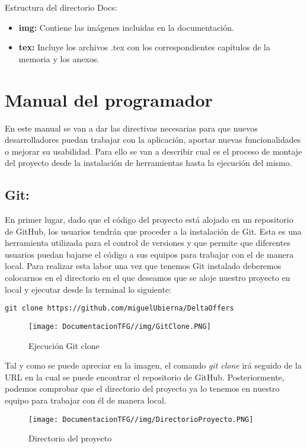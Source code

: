 Estructura del directorio Docs:
\begin{itemize}
    \item \textbf{img: } Contiene las imágenes incluidas en la documentación.
    \item \textbf{tex: } Incluye los archivos .tex con los correspondientes capítulos de la memoria y los anexos.
\end{itemize}
    
\section{Manual del programador}
En este manual se van a dar las directivas necesarias para que nuevos desarrolladores puedan trabajar con la aplicación, aportar nuevas funcionalidades o mejorar su usabilidad. Para ello se van a describir cual es el proceso de montaje del proyecto desde la instalación de herramientas hasta la ejecución del mismo.

\subsection{Git:} En primer lugar, dado que el código del proyecto está alojado en un repositorio de GitHub, los usuarios tendrán que proceder a la instalación de Git. Esta es una herramienta utilizada para el control de versiones y que permite que diferentes usuarios puedan bajarse el código a sus equipos para trabajar con el de manera local. Para realizar esta labor una vez que tenemos Git instalado deberemos colocarnos en el directorio en el que deseamos que se aloje nuestro proyecto en local y ejecutar desde la terminal lo siguiente:

\texttt{git clone https://github.com/miguelUbierna/DeltaOffers}
\begin{figure}[H]
    \centering
    \texttt{[image: DocumentacionTFG//img/GitClone.PNG]}
    \caption{Ejecución Git clone}
\end{figure}

Tal y como se puede apreciar en la imagen, el comando \textit{git clone} irá seguido de la URL en la cual se puede encontrar el repositorio de GitHub. Posteriormente, podemos comprobar que el directorio del proyecto ya lo tenemos en nuestro equipo para trabajar con él de manera local.

\begin{figure}[H]
    \centering
    \texttt{[image: DocumentacionTFG//img/DirectorioProyecto.PNG]}
    \caption{Directorio del proyecto}
\end{figure}

